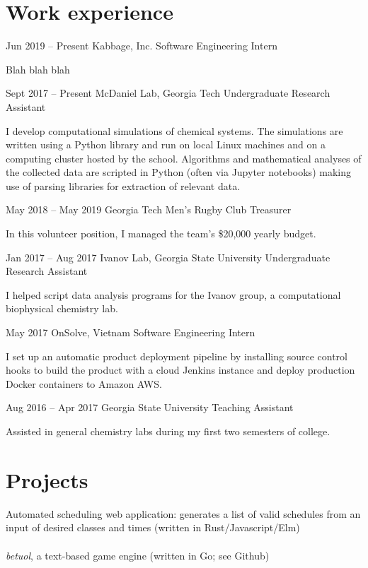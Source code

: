 \documentclass{tccv}
\begin{document}
\begin{minipage}[t]{0.65\textwidth}
\section{Work experience}

\begin{eventlist}

\item{Jun 2019 -- Present}
     {Kabbage, Inc.}
     {Software Engineering Intern}
    
Blah blah blah

\item{Sept 2017 -- Present}
     {McDaniel Lab, Georgia Tech}
     {Undergraduate Research Assistant}

I develop computational simulations of chemical systems. The simulations are written using a Python library and run on local Linux machines and on a computing cluster hosted by the school. Algorithms and mathematical analyses of the collected data are scripted in Python (often via Jupyter notebooks) making use of parsing libraries for extraction of relevant data.

\item{May 2018 -- May 2019}
     {Georgia Tech Men's Rugby Club}
     {Treasurer}

In this volunteer position, I managed the team's \$20,000 yearly budget.

\item{Jan 2017 -- Aug 2017}
     {Ivanov Lab, Georgia State University}
     {Undergraduate Research Assistant}

I helped script data analysis programs for the Ivanov group, a computational biophysical chemistry lab.

\item{May 2017}
     {OnSolve, Vietnam}
     {Software Engineering Intern}

I set up an automatic product deployment pipeline by installing source control hooks to build the product with a cloud Jenkins instance and deploy production Docker containers to Amazon AWS.

\item{Aug 2016 -- Apr 2017}
     {Georgia State University}
     {Teaching Assistant}

Assisted in general chemistry labs during my first two semesters of college.

\section{Projects}

Automated scheduling web application: generates a list of valid schedules from an input of desired classes and times (written in Rust/Javascript/Elm) \\\\
\emph{betuol}, a text-based game engine (written in Go; see Github)

\end{eventlist}
\end{minipage}
\end{document}

